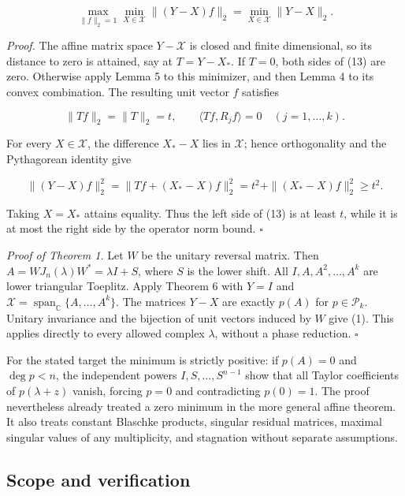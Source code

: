 \documentclass[10pt,a4paper]{article}
\begin{document}
\[
\max_{\|f\|_2=1}\min_{X\in\mathcal X}\|(Y-X)f\|_2
=\min_{X\in\mathcal X}\|Y-X\|_2.
\tag{13}
\]

\emph{Proof.} The affine matrix space \(Y-\mathcal X\) is closed and
finite dimensional, so its distance to zero is attained, say at
\(T=Y-X_*\). If \(T=0\), both sides of (13) are zero. Otherwise apply
Lemma 5 to this minimizer, and then Lemma 4 to its convex combination.
The resulting unit vector \(f\) satisfies

\nopagebreak[4]

\[
\|Tf\|_2=\|T\|_2=t,\qquad
\langle Tf,R_jf\rangle=0\quad(j=1,\ldots,k).
\tag{14}
\]

For every \(X\in\mathcal X\), the difference \(X_*-X\) lies in
\(\mathcal X\); hence orthogonality and the Pythagorean identity give

\nopagebreak[4]

\[
\|(Y-X)f\|_2^2
=\|Tf+(X_*-X)f\|_2^2
=t^2+\|(X_*-X)f\|_2^2\ge t^2.
\tag{15}
\]

Taking \(X=X_*\) attains equality. Thus the left side of (13) is at
least \(t\), while it is at most the right side by the operator norm
bound. \(\square\)

\emph{Proof of Theorem 1.} Let \(W\) be the unitary reversal matrix.
Then \(A=WJ_n(\lambda)W^*=\lambda I+S\), where \(S\) is the lower shift.
All \(I,A,A^2,\ldots,A^k\) are lower triangular Toeplitz. Apply Theorem
6 with \(Y=I\) and
\(\mathcal X=\operatorname{span}_{\mathbb C}\{A,\ldots,A^k\}\). The
matrices \(Y-X\) are exactly \(p(A)\) for \(p\in\mathcal P_k\). Unitary
invariance and the bijection of unit vectors induced by \(W\) give (1).
This applies directly to every allowed complex \(\lambda\), without a
phase reduction. \(\square\)

For the stated target the minimum is strictly positive: if \(p(A)=0\)
and \(\deg p<n\), the independent powers \(I,S,\ldots,S^{n-1}\) show
that all Taylor coefficients of \(p(\lambda+z)\) vanish, forcing \(p=0\)
and contradicting \(p(0)=1\). The proof nevertheless already treated a
zero minimum in the more general affine theorem. It also treats constant
Blaschke products, singular residual matrices, maximal singular values
of any multiplicity, and stagnation without separate assumptions.


\subsection{Scope and verification}\label{scope-and-verification}
\end{document}
